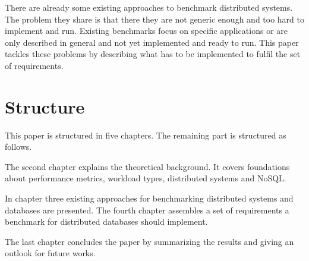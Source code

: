 There are already some existing approaches to benchmark distributed systems. The problem they share is that there they are not generic enough and too hard to implement and run. Existing benchmarks focus on specific applications or are only described in general and not yet implemented and ready to run. This paper tackles these problems by describing what has to be implemented to fulfil the set of requirements.


\section{Structure}
\label{sec:structure}
This paper is structured in five chapters. The remaining part is structured as follows.

The second chapter explains the theoretical background. It covers foundations about performance metrics, workload types, distributed systems and NoSQL.

In chapter three existing approaches for benchmarking distributed systems and databases are presented. The fourth chapter assembles a set of requirements a benchmark for distributed databases should implement.

The last chapter concludes the paper by summarizing the results and giving an outlook for future works.